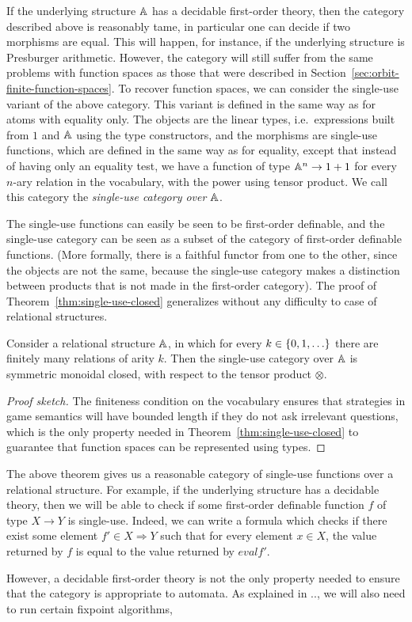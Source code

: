If the underlying structure $\mathbb A$ has a decidable first-order theory, then the category described above is reasonably tame, in particular one can decide if two morphisms are equal. This will happen, for instance, if the underlying structure is Presburger arithmetic. However, the category will still suffer from the same problems with function spaces as those that were described in Section~\ref{sec:orbit-finite-function-spaces}. 
To recover function spaces, we can consider the single-use variant of the above category. This variant is defined in the same way as for atoms with equality only. The objects are the linear types, i.e.~expressions built from $1$ and $\mathbb A$ using the type constructors, and the morphisms are single-use functions, which are defined in the same way as for equality, except that instead of having only an equality test, we have a function of type $\mathbb A^n \to 1+1$ for every $n$-ary relation in the vocabulary, with the power using tensor product. We call this category the \emph{single-use category over $\mathbb A$}. 

The single-use functions can easily be seen to be first-order definable, and the single-use category can be seen as a subset of the category of first-order definable functions. (More formally, there is a faithful functor from one to the other, since the objects are not the same, because the single-use category makes a distinction between products that is not made in the first-order category).  The proof of Theorem~\ref{thm:single-use-closed} generalizes without any difficulty to case of relational structures. 

\begin{theorem}\label{thm:single-use-closed-relational-structures}
    Consider a relational structure $\mathbb A$, in which for every $k \in \{0,1,\ldots\}$ there are finitely many relations of arity $k$. Then the single-use category over $\mathbb A$ is symmetric monoidal closed, with respect to the tensor product $\otimes$.
\end{theorem}
\begin{proof}[Proof sketch]
    The finiteness condition on the vocabulary  ensures that strategies in game semantics will have bounded length if they do not ask irrelevant questions, which is the only property needed in Theorem~\ref{thm:single-use-closed} to guarantee that function spaces can be represented using types. 
\end{proof}

The above theorem gives us a reasonable category of single-use functions over a relational structure. For example, if the underlying structure has a decidable theory, then we will be able to check if some first-order definable function $f$  of type $X \to Y$  is single-use. Indeed, we can write a formula which checks if there exist some element  $f' \in X \Rightarrow Y$ such that for every element $x \in X$, the value returned by $f$ is equal to the value returned by $eval f'$. 

However, a decidable first-order theory is not the only property needed to ensure that the category is appropriate to automata. As explained in .., we will also need to run certain fixpoint algorithms,  
